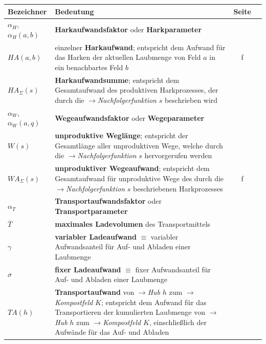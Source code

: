 \begin{tabular}{lp{11cm}cm{1cm}}
\textbf{Bezeichner} & \textbf{Bedeutung} & \textbf{Seite}\\
\hline

$\alpha_H$, $\alpha_H(a,b)$
& \textbf{Harkaufwandsfaktor} oder \textbf{Harkparameter}
& \pageref{Harkaufwandsfaktor}\\

$HA(a,b)$
& einzelner \textbf{Harkaufwand}; entspricht dem Aufwand für das Harken der aktuellen Laubmenge von Feld $a$ in ein benachbartes Feld $b$
& \pageref{Harkaufwand}f\\

$HA_{\Sigma}(s)$
&\textbf{Harkaufwandsumme}; entspricht dem Gesamtaufwand des produktiven Harkprozesses, der durch die $\rightarrow$\textit{Nachfolgerfunktion} $s$ beschrieben wird
&\pageref{Formel_Harkaufwandsumme}\\

$\alpha_W$, $\alpha_W(a,q)$
& \textbf{Wegeaufwandsfaktor} oder \textbf{Wegeparameter}
& \pageref{Wegeaufwandsfaktor}\\

$W(s)$
&\textbf{unproduktive Weglänge}; entspricht der Gesamtlänge aller unproduktiven Wege, welche durch die $\rightarrow$\textit{Nachfolgerfunktion} $s$ hervorgerufen werden
& \pageref{Wegeaufwandsfaktor}\\

$WA_{\Sigma}(s)$
&\textbf{unproduktiver Wegeaufwand}; entspricht dem Gesamtaufwand für unproduktive Wege des durch die $\rightarrow$\textit{Nachfolgerfunktion} $s$ beschriebenen Harkprozesses
& \pageref{Wegeaufwandsfaktor}f\\

$\alpha_T$
& \textbf{Transportaufwandsfaktor} oder \textbf{Transportparameter}
& \pageref{Transportaufwandsfaktor}\\

$\overline{T}$
& \textbf{maximales Ladevolumen} des Transportmittels
& \pageref{Ladevolumen}\\

$\gamma$
& \textbf{variabler Ladeaufwand} $\equiv$ variabler Aufwandsanteil für Auf- und Abladen einer Laubmenge 
& \pageref{variabler Ladeaufwand}\\

$\sigma$
& \textbf{fixer Ladeaufwand} $\equiv$ fixer Aufwandsanteil für Auf- und Abladen einer Laubmenge
& \pageref{fixer Ladeaufwand}\\

$TA(h)$
& \textbf{Transportaufwand} von $\rightarrow$\textit{Hub} $h$ zum $\rightarrow$\textit{Kompostfeld} $K$; entspricht dem Aufwand für das Transportieren der kumulierten Laubmenge von $\rightarrow$\textit{Hub} $h$ zum $\rightarrow$\textit{Kompostfeld} $K$, einschließlich der Aufwände für das Auf- und Abladen
& \pageref{Transportaufwandsfaktor}\\


\end{tabular}
